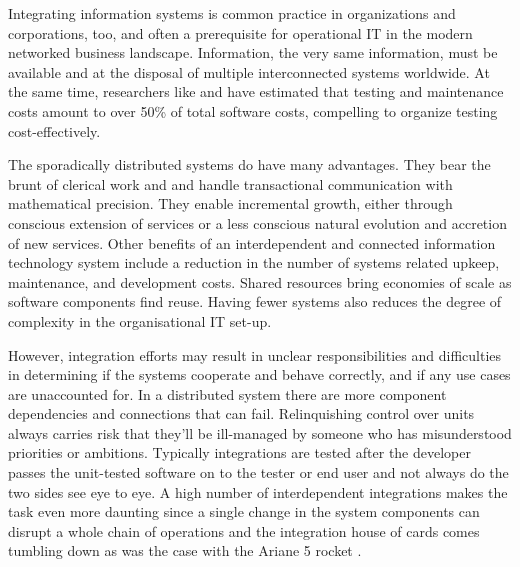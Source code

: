\documentclass[12pt,a4paper,oneside,pdftex]{report}
\begin{document}
Integrating information systems is common practice in organizations and corporations, too, and often a prerequisite for operational IT in the modern networked business landscape. Information, the very same information, must be available and at the disposal of multiple interconnected systems worldwide. At the same time, researchers like \citet{myers1976software} and \citet{reid2005art} have estimated that testing and maintenance costs amount to over 50\% of total software costs, compelling to organize testing cost-effectively.

The sporadically distributed systems do have many advantages. They bear the brunt of clerical work and and handle transactional communication with mathematical precision. They enable incremental growth, either through conscious extension of services or a less conscious natural evolution and accretion of new services. Other benefits of an interdependent and connected information technology system include a reduction in the number of systems related upkeep, maintenance, and development costs. Shared resources bring economies of scale as software components find reuse. \citep{rehman2007testing} Having fewer systems also reduces the degree of complexity in the organisational IT set-up.

\begin{comment}
Automation is one of the great boons brought on by technological development on one hand freeing up resources like labour for more value-adding purposes --- and permitting the execution of uniform, repeatable processes and process control on the other. The pinnacle of advancement and prosperity on which society stands today is based on a continuous flow of various automated tasks and electronic services, many of which are complex and involve a slew of actors or agents. Work is divided and its completion therefore requires cooperation between service systems.
\end{comment}

However, integration efforts may result in unclear responsibilities and difficulties in determining if the systems cooperate and behave correctly, and if any use cases are unaccounted for. In a distributed system there are more component dependencies and connections that can fail. Relinquishing control over units always carries risk that they'll be ill-managed by someone who has misunderstood priorities or ambitions. Typically integrations are tested after the developer passes the unit-tested software on to the tester or end user and not always do the two sides see eye to eye. A high number of interdependent integrations makes the task even more daunting since a single change in the system components can disrupt a whole chain of operations and the integration house of cards comes tumbling down as was the case with the Ariane 5 rocket \citep{pezze2008software, rehman2007testing}.
\end{document}
